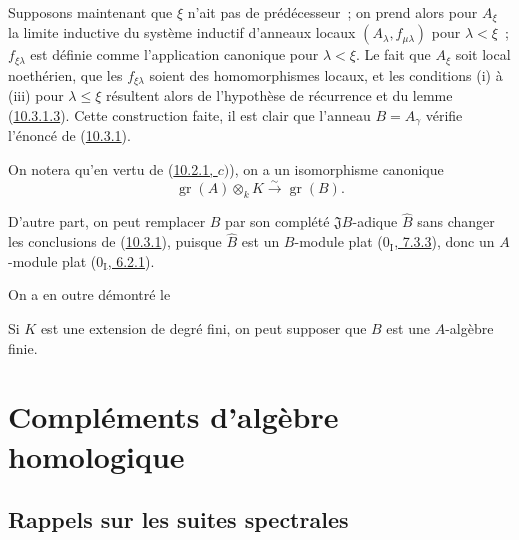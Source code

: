 \begin{env}[10.3.1.4]
Supposons maintenant que $\xi$ n'ait pas de prédécesseur~; on prend alors
pour $A_\xi$ la limite inductive du système inductif d'anneaux locaux
$(A_\lambda,f_{\mu\lambda})$ pour $\lambda<\xi$~; $f_{\xi\lambda}$ est définie
comme l'application canonique pour $\lambda<\xi$. Le fait que $A_\xi$ soit
local noethérien, que les $f_{\xi\lambda}$ soient des homomorphismes locaux,
et les conditions (i) à (iii) pour $\lambda\leq\xi$
résultent alors de l'hypothèse de récurrence et du lemme
(\hyperref[0.10.3.1.3-fr]{10.3.1.3}). Cette construction faite, il est clair
que l'anneau $B=A_\gamma$ vérifie l'énoncé de
(\hyperref[0.10.3.1-fr]{10.3.1}).
\end{env}

On notera qu'en vertu de (\hyperref[0.10.2.1-fr]{10.2.1, $c)$}), on a un
isomorphisme canonique
\[
\label{0.10.3.1.5-fr}
  \operatorname{gr}(A)\otimes_k K\xrightarrow{\sim}\operatorname{gr}(B).
  \tag{10.3.1.5}
\]

D'autre part, on peut remplacer $B$ par son complété $\mathfrak J B$-adique
$\widehat B$ sans changer les conclusions de
(\hyperref[0.10.3.1-fr]{10.3.1}), puisque $\widehat B$ est un $B$-module plat
(\hyperref[0.7.3.3-fr]{$0_{\mathrm I}$, 7.3.3}), donc un $A$-module plat
(\hyperref[0.6.2.1-fr]{$0_{\mathrm I}$, 6.2.1}).

On a en outre démontré le

\begin{corollary}[10.3.2]
\label{0.10.3.2-fr}
Si $K$ est une extension de degré fini, on peut supposer que $B$ est une
$A$-algèbre finie.
\end{corollary}

\section{Compléments d'algèbre homologique}
\label{section:0.11-fr}

\subsection{Rappels sur les suites spectrales}
\label{subsection:0.11.1-fr}

